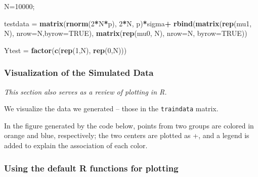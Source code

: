 \documentclass[
]{book}
\newenvironment{Shaded}{\begin{snugshade}}{\end{snugshade}}
\newcommand{\AttributeTok}[1]{\textcolor[rgb]{0.13,0.29,0.53}{#1}}
\newcommand{\ConstantTok}[1]{\textcolor[rgb]{0.56,0.35,0.01}{#1}}
\newcommand{\DecValTok}[1]{\textcolor[rgb]{0.00,0.00,0.81}{#1}}
\newcommand{\FunctionTok}[1]{\textcolor[rgb]{0.13,0.29,0.53}{\textbf{#1}}}
\newcommand{\NormalTok}[1]{#1}
\newcommand{\OtherTok}[1]{\textcolor[rgb]{0.56,0.35,0.01}{#1}}
\newcommand{\SpecialCharTok}[1]{\textcolor[rgb]{0.81,0.36,0.00}{\textbf{#1}}}
\begin{document}
\begin{Shaded}
\begin{Highlighting}[]
\NormalTok{N}\OtherTok{=}\DecValTok{10000}\NormalTok{;  }

\NormalTok{testdata }\OtherTok{=} \FunctionTok{matrix}\NormalTok{(}\FunctionTok{rnorm}\NormalTok{(}\DecValTok{2}\SpecialCharTok{*}\NormalTok{N}\SpecialCharTok{*}\NormalTok{p), }\DecValTok{2}\SpecialCharTok{*}\NormalTok{N, p)}\SpecialCharTok{*}\NormalTok{sigma}\SpecialCharTok{+} 
           \FunctionTok{rbind}\NormalTok{(}\FunctionTok{matrix}\NormalTok{(}\FunctionTok{rep}\NormalTok{(mu1, N), }\AttributeTok{nrow=}\NormalTok{N,}\AttributeTok{byrow=}\ConstantTok{TRUE}\NormalTok{), }
           \FunctionTok{matrix}\NormalTok{(}\FunctionTok{rep}\NormalTok{(mu0, N), }\AttributeTok{nrow=}\NormalTok{N, }\AttributeTok{byrow=}\ConstantTok{TRUE}\NormalTok{))}

\NormalTok{Ytest }\OtherTok{=} \FunctionTok{factor}\NormalTok{(}\FunctionTok{c}\NormalTok{(}\FunctionTok{rep}\NormalTok{(}\DecValTok{1}\NormalTok{,N), }\FunctionTok{rep}\NormalTok{(}\DecValTok{0}\NormalTok{,N)))}
\end{Highlighting}
\end{Shaded}

\subsubsection{Visualization of the Simulated Data}\label{visualization-of-the-simulated-data}

\emph{This section also serves as a review of plotting in R.}

We visualize the data we generated -- those in the \texttt{traindata} matrix.

In the figure generated by the code below, points from two groups are colored in orange and blue, respectively; the two centers are plotted as +, and a legend is added to explain the association of each color.

\subsubsection{Using the default R functions for plotting}\label{using-the-default-r-functions-for-plotting}
\end{document}
